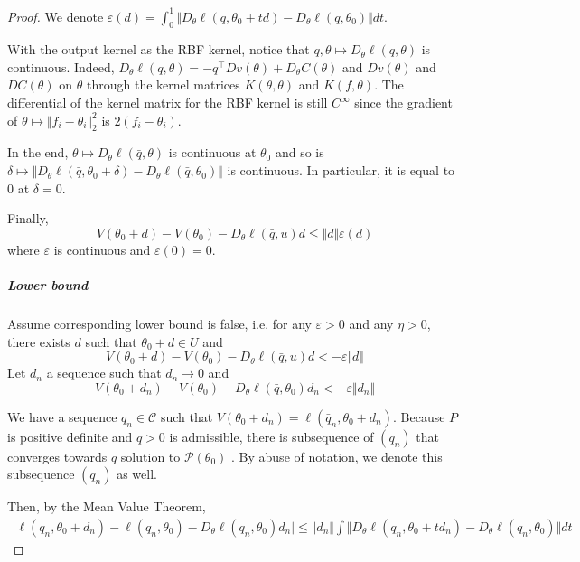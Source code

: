 \begin{proof}
We denote $\varepsilon(d)= \int_0^1 \Vert D_\theta\ell(\bar q, \theta_0 +td) - D_\theta\ell(\bar q, \theta_0)\Vert dt$.

With the output kernel as the RBF kernel, notice that $q, \theta \mapsto D_\theta\ell(q, \theta)$ is continuous. Indeed, $D_\theta \ell(q, \theta) = -q^\top D v(\theta) + D_\theta C(\theta)$ and $D v(\theta)$ and $DC(\theta)$ on $\theta$ through the kernel matrices $K(\theta, \theta)$ and $K(f, \theta)$. The differential of the kernel matrix for the RBF kernel is still $C^\infty$ since the gradient of $\theta \mapsto \Vert f_i - \theta_i\Vert_2^2$ is $2(f_i - \theta_i)$.

In the end, $\theta \mapsto D_\theta\ell(\bar q, \theta)$ is continuous at $\theta_0$ and so is $ \delta \mapsto \Vert D_\theta\ell(\bar q, \theta_0 + \delta) -D_\theta\ell(\bar q, \theta_0)\Vert$ is continuous. In particular, it is equal to $0$ at $\delta=0$.

Finally,
   \begin{equation}
       V(\theta_0+d) - V(\theta_0) - D_\theta\ell(\bar q, u)d \leq \Vert d\Vert \varepsilon(d)
   \end{equation}
where $\varepsilon$ is continuous and $\varepsilon(0)=0$.


\subparagraph{Lower bound}
Assume corresponding lower bound is false, i.e. for any $\varepsilon>0$ and any $\eta >0$, there exists $d$ such that $\theta_0 + d\in U$ and
   \begin{equation}
       V(\theta_0+d) - V(\theta_0) - D_\theta\ell(\bar q, u)d < -\varepsilon\Vert d\Vert
   \end{equation}
    Let $d_n$ a sequence such that $d_n \to 0$ and
   \begin{equation}\label{eq:proof_hyp}
       V(\theta_0+d_n) - V(\theta_0) - D_\theta\ell(\bar q, \theta_0)d_n < -\varepsilon\Vert d_n\Vert
   \end{equation}

   We have a sequence $q_n\in \mathcal C$ such that $V(\theta_0+ d_n) = \ell(\bar q_n, \theta_0 + d_n)$. Because $P$ is positive definite and $q > 0$ is admissible, there is subsequence of $(q_n)$ that converges towards $\bar q$ solution to $\mathcal P(\theta_0)$ \citep[Lemma 14.4]{lee}. By abuse of notation, we denote this subsequence $(q_n)$ as well.

   Then, by the Mean Value Theorem,
   \begin{align}
       \vert \ell(q_n, \theta_0 + d_n) - \ell(q_n, \theta_0) - D_\theta \ell(q_n, \theta_0)d_n\vert \leq \Vert d_n\Vert \int \Vert D_\theta \ell(q_n, \theta_0 + td_n) - D_\theta \ell(q_n, \theta_0)\Vert dt
   \end{align}


\end{proof}
